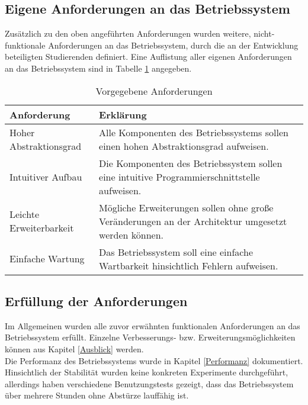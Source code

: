 \subsection{Eigene Anforderungen an das Betriebssystem}
Zusätzlich zu den oben angeführten Anforderungen wurden weitere, nicht-funktionale Anforderungen an das Betriebssystem, durch die an der Entwicklung beteiligten Studierenden definiert. Eine Auflistung aller eigenen Anforderungen an das Betriebssystem sind in Tabelle \ref{table:Own-Requirements} angegeben.

\begin{table}[H]
\begin{tabular}{ p{5cm}| p{9cm} }
  \textbf{Anforderung} & \textbf{Erklärung} \\ 
  \hline
  Hoher Abstraktionsgrad & Alle Komponenten des Betriebssystems sollen einen hohen Abstraktionsgrad aufweisen. \\
  Intuitiver Aufbau & Die Komponenten des Betriebssystem sollen eine intuitive Programmierschnittstelle aufweisen. \\
  Leichte Erweiterbarkeit & Mögliche Erweiterungen sollen ohne große Veränderungen an der Architektur umgesetzt werden können. \\
  Einfache Wartung & Das Betriebssystem soll eine einfache Wartbarkeit hinsichtlich Fehlern aufweisen. \\
 \end{tabular}
 \caption{Vorgegebene Anforderungen}
 \label{table:Own-Requirements}
\end{table}

\subsection{Erfüllung der Anforderungen}
Im Allgemeinen wurden alle zuvor erwähnten funktionalen Anforderungen an das Betriebssystem erfüllt. Einzelne Verbesserungs- bzw. Erweiterungsmöglichkeiten können aus Kapitel \ref{Ausblick} werden. \\
Die Performanz des Betriebssystems wurde in Kapitel \ref{Performanz} dokumentiert.
Hinsichtlich der Stabilität wurden keine konkreten Experimente durchgeführt, allerdings haben verschiedene Benutzungstests gezeigt, dass das Betriebssystem über mehrere Stunden ohne Abstürze lauffähig ist.

\pagebreak 